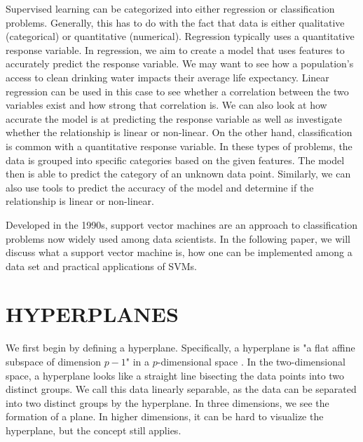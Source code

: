 \documentclass[12pt]{article}
\begin{document}
Supervised learning can be categorized into either regression or classification problems. Generally, this has to do with the fact that data is either qualitative (categorical) or quantitative (numerical). Regression typically uses a quantitative response variable. In regression, we aim to create a model that uses features to accurately predict the response variable. We may want to see how a population's access to clean drinking water impacts their average life expectancy. Linear regression can be used in this case to see whether a correlation between the two variables exist and how strong that correlation is. We can also look at how accurate the model is at predicting the response variable as well as investigate whether the relationship is linear or non-linear. On the other hand, classification is common with a quantitative response variable. In these types of problems, the data is grouped into specific categories based on the given features. The model then is able to predict the category of an unknown data point. Similarly, we can also use tools to predict the accuracy of the model and determine if the relationship is linear or non-linear.

Developed in the 1990s, support vector machines are an approach to classification problems now widely used among data scientists. In the following paper, we will discuss what a support vector machine is, how one can be implemented among a data set and practical applications of SVMs.

\section{HYPERPLANES}

We first begin by defining a hyperplane. Specifically, a hyperplane is "a flat affine subspace of dimension $p-1$" in a $p$-dimensional space \cite{introstatlearning}. In the two-dimensional space, a hyperplane looks like a straight line bisecting the data points into two distinct groups. We call this data linearly separable, as the data can be separated into two distinct groups by the hyperplane. In three dimensions, we see the formation of a plane. In higher dimensions, it can be hard to visualize the hyperplane, but the concept still applies.
\end{document}
